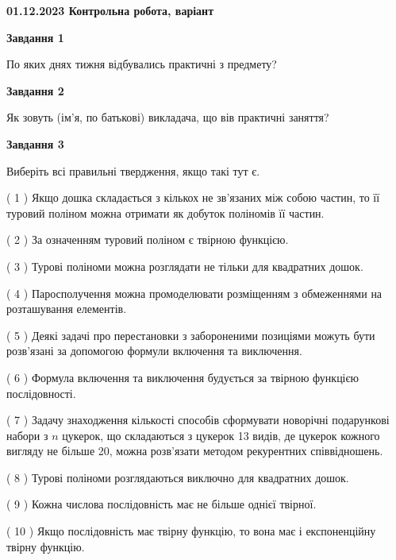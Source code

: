 \documentclass[12pt, ukrainian]{article}
\begin{document}
\begin {large}

\textbf{01.12.2023 Контрольна робота, варіант  }\par


{
{\begin {center}\textbf{Завдання 1}\end {center}}\par
По яких днях тижня відбувались практичні з предмету?\par
{\begin {center}\textbf{Завдання 2}\end {center}}\par
Як зовуть (ім'я, по батькові) викладача, що вів практичні заняття?\par
{\begin {center}\textbf{Завдання 3}\end {center}}\par
Виберіть всі правильні твердження, якщо такі тут є.\par
\vspace{2mm}
( 1 ) Якщо дошка складається з кількох не зв’язаних між собою частин, то її туровий поліном можна отримати як добуток поліномів її частин.%

( 2 ) За означенням туровий поліном є твірною функцією.%

( 3 ) Турові поліноми можна розглядати не тільки для квадратних дошок.%

( 4 ) Паросполучення можна промоделювати розміщенням з обмеженнями на розташування елементів.%

( 5 ) Деякі задачі про перестановки з забороненими позиціями можуть бути розв’я\-за\-ні за допомогою формули включення та виключення.%

( 6 ) Формула включення та виключення будується за твірною функцією послідовності.%

( 7 ) Задачу знаходження кількості способів сформувати новорічні подарункові набори з $n$ цукерок, що складаються з цукерок 13 видів, де цукерок кожного вигляду не більше 20, можна розв’язати методом рекурентних співвідношень.%

( 8 ) Турові поліноми розглядаються виключно для квадратних дошок.%

( 9 ) Кожна числова послідовність має не більше однієї твірної.%

( 10 ) Якщо послідовність має твірну функцію, то вона має і експоненційну твірну функцію.%
}
\end {large}

\vspace{4mm}
\newpage
\end{document}

